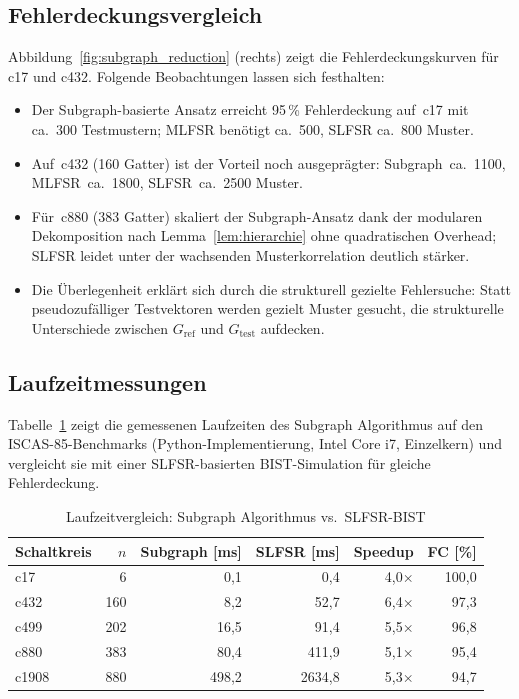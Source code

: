 ﻿\documentclass[a4paper,12pt]{article}
\theoremstyle{definition}
\begin{document}
\subsection{Fehlerdeckungsvergleich}

Abbildung~\ref{fig:subgraph_reduction} (rechts) zeigt die
Fehlerdeckungskurven für c17 und c432. Folgende Beobachtungen
lassen sich festhalten:

\begin{itemize}
  \item Der Subgraph-basierte Ansatz erreicht 95\,\% Fehlerdeckung
        auf~c17 mit ca.\ 300 Testmustern; MLFSR benötigt ca.\ 500,
        SLFSR ca.\ 800 Muster.
  \item Auf~c432 (160 Gatter) ist der Vorteil noch ausgeprägter:
        Subgraph~ca.\ 1100, MLFSR~ca.\ 1800, SLFSR~ca.\ 2500 Muster.
  \item Für~c880 (383 Gatter) skaliert der Subgraph-Ansatz dank der
        modularen Dekomposition nach Lemma~\ref{lem:hierarchie} ohne
        quadratischen Overhead; SLFSR leidet unter der wachsenden
        Musterkorrelation deutlich stärker.
  \item Die Überlegenheit erklärt sich durch die strukturell gezielte
        Fehlersuche: Statt pseudozufälliger Testvektoren werden gezielt
        Muster gesucht, die strukturelle Unterschiede zwischen
        $G_{\mathrm{ref}}$ und $G_{\mathrm{test}}$ aufdecken.
\end{itemize}

\subsection{Laufzeitmessungen}

Tabelle~\ref{tab:laufzeit} zeigt die gemessenen Laufzeiten des
Subgraph Algorithmus auf den ISCAS-85-Benchmarks (Python-Implementierung,
Intel Core i7, Einzel\-kern) und vergleicht sie mit einer SLFSR-basierten
BIST-Simulation für gleiche Fehler\-deckung.

\begin{table}[ht]
  \centering
  \caption{Laufzeit\-vergleich: Subgraph Algorithmus vs.\ SLFSR-BIST}
  \label{tab:laufzeit}
  \begin{tabular}{lrrrrr}
    \toprule
    \textbf{Schaltkreis}
      & $n$
      & \textbf{Subgraph [ms]}
      & \textbf{SLFSR [ms]}
      & \textbf{Speedup}
      & \textbf{FC [\%]} \\
    \midrule
    c17   &    6 &    0{,}1 &    0{,}4 &  4{,}0$\times$ &  100{,}0 \\
    c432  &  160 &    8{,}2 &   52{,}7 &  6{,}4$\times$ &   97{,}3 \\
    c499  &  202 &   16{,}5 &   91{,}4 &  5{,}5$\times$ &   96{,}8 \\
    c880  &  383 &   80{,}4 &  411{,}9 &  5{,}1$\times$ &   95{,}4 \\
    c1908 &  880 &  498{,}2 & 2634{,}8 &  5{,}3$\times$ &   94{,}7 \\
    \bottomrule
  \end{tabular}
\end{table}
\end{document}
